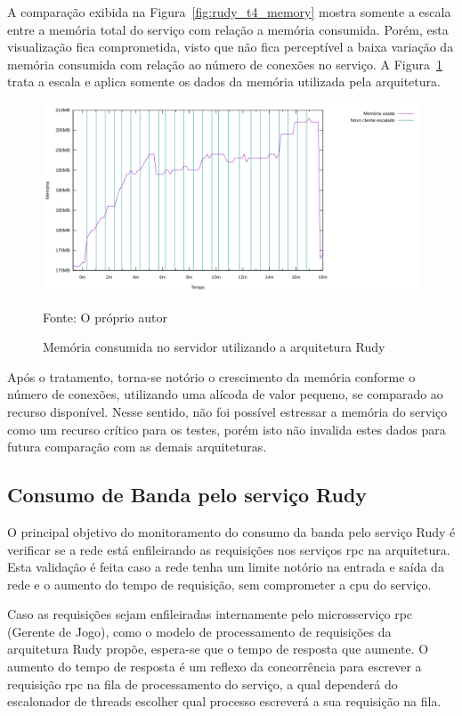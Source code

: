 A comparação exibida na Figura~\ref{fig:rudy_t4_memory} mostra somente a escala entre a memória total do serviço com relação a memória consumida.
%
Porém, esta visualização fica comprometida, visto que não fica perceptível a baixa variação da memória consumida com relação ao número de conexões no serviço.
%
A Figura~\ref{fig:rudy_t4_memory_used} trata a escala e aplica somente os dados da memória utilizada pela arquitetura.

\begin{figure}[htb!]
    \caption{Memória consumida no servidor utilizando a arquitetura Rudy}
    \label{fig:rudy_t4_memory_used}
    \includegraphics[width=\textwidth]{metricas_rudy_t4/memory_used.png}
    \centering
    
    Fonte: O próprio autor
\end{figure}

Após o tratamento, torna-se notório o crescimento da memória conforme o número de conexões, utilizando uma alícoda de valor pequeno, se comparado ao recurso disponível.
%
Nesse sentido, não foi possível estressar a memória do serviço como um recurso crítico para os testes, porém isto não invalida estes dados para futura comparação com as demais arquiteturas.

\subsection{Consumo de Banda pelo serviço Rudy}

O principal objetivo do monitoramento do consumo da banda pelo serviço Rudy é verificar se a rede está enfileirando as requisições nos serviços \ac{rpc} na arquitetura.
%
Esta validação é feita caso a rede tenha um limite notório na entrada e saída da rede e o aumento do tempo de requisição, sem comprometer a \ac{cpu} do serviço.

Caso as requisições sejam enfileiradas internamente pelo microsserviço \ac{rpc} (Gerente de Jogo), como o modelo de processamento de requisições da arquitetura Rudy propõe, espera-se que o tempo de resposta que aumente.
%
O aumento do tempo de resposta é um reflexo da concorrência para escrever a requisição \ac{rpc} na fila de processamento do serviço, a qual dependerá do escalonador de threads escolher qual processo escreverá a sua requisição na fila.

